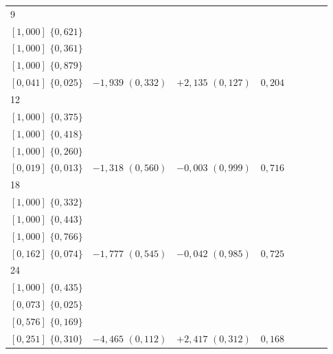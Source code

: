 \documentclass[12pt,a4paper]{article}
\begin{document}
\begin{table}[htbp]
{\begin{tabular}{lcccc|ccc}
9 & \makecell{$+0{,}333$ $(0{,}592)$\\ \scriptsize$[1{,}000]$ $\{0{,}621\}$} & \makecell{$+0{,}481$ $(0{,}346)$\\ \scriptsize$[1{,}000]$ $\{0{,}361\}$} & \makecell{$0{,}861$\\ \scriptsize$[1{,}000]$ $\{0{,}879\}$} & \makecell{$\mathbf{+1{,}181}$ $\mathbf{(0{,}008)}$\\ \scriptsize$[0{,}041]$ $\{0{,}025\}$} & $-1{,}939$ $(0{,}332)$ & $+2{,}135$ $(0{,}127)$ & $0{,}204$ \\
12 & \makecell{$-0{,}580$ $(0{,}376)$\\ \scriptsize$[1{,}000]$ $\{0{,}375\}$} & \makecell{$+0{,}474$ $(0{,}399)$\\ \scriptsize$[1{,}000]$ $\{0{,}418\}$} & \makecell{$0{,}247$\\ \scriptsize$[1{,}000]$ $\{0{,}260\}$} & \makecell{$\mathbf{+1{,}606}$ $\mathbf{(0{,}003)}$\\ \scriptsize$[0{,}019]$ $\{0{,}013\}$} & $-1{,}318$ $(0{,}560)$ & $-0{,}003$ $(0{,}999)$ & $0{,}716$ \\
18 & \makecell{$-0{,}805$ $(0{,}268)$\\ \scriptsize$[1{,}000]$ $\{0{,}332\}$} & \makecell{$-0{,}529$ $(0{,}415)$\\ \scriptsize$[1{,}000]$ $\{0{,}443\}$} & \makecell{$0{,}755$\\ \scriptsize$[1{,}000]$ $\{0{,}766\}$} & \makecell{$\mathbf{+1{,}436}$ $\mathbf{(0{,}041)}$\\ \scriptsize$[0{,}162]$ $\{0{,}074\}$} & $-1{,}777$ $(0{,}545)$ & $-0{,}042$ $(0{,}985)$ & $0{,}725$ \\
24 & \makecell{$-0{,}603$ $(0{,}346)$\\ \scriptsize$[1{,}000]$ $\{0{,}435\}$} & \makecell{$\mathbf{-2{,}201}$ $\mathbf{(0{,}012)}$\\ \scriptsize$[0{,}073]$ $\{0{,}025\}$} & \makecell{$0{,}096$\\ \scriptsize$[0{,}576]$ $\{0{,}169\}$} & \makecell{$+0{,}928$ $(0{,}251)$\\ \scriptsize$[0{,}251]$ $\{0{,}310\}$} & $-4{,}465$ $(0{,}112)$ & $+2{,}417$ $(0{,}312)$ & $0{,}168$ \\
\bottomrule
\end{tabular}%
}
\end{table}
\end{document}
